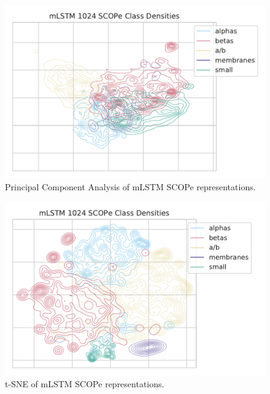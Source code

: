 \documentclass[a4paper,12pt]{article}
\begin{document}
\begin{minipage}{\linewidth}
	\centering
	\begin{minipage}{0.48\linewidth}
		\begin{figure}[H]
			\includegraphics[width=\linewidth]{figures/fig2c_mLSTM_1024_no_trunc_PCA.pdf}
			\caption{Principal Component Analysis of mLSTM SCOPe representations.}
			\label{fig:mLSTM_pca_compare}
		\end{figure}
	\end{minipage}
	\hfill
	\begin{minipage}{0.48\linewidth}
		\begin{figure}[H]
			\includegraphics[width=\linewidth]{figures/fig2c_mLSTM_1024_no_trunc.pdf}
			\caption{t-SNE of mLSTM SCOPe representations.}
			\label{fig:mLSTM_tSNE_compare}
		\end{figure}
	\end{minipage}
\end{minipage}
\end{document}
